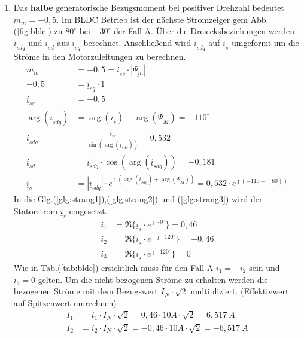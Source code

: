 \begin{solution}
\begin{enumerate}
\item Das \textbf{halbe} generatorische Bezugsmoment bei positiver Drehzahl bedeutet $m_m = -0,5$. Im BLDC Betrieb ist der nächste Stromzeiger gem Abb.(\ref{fig:bldc}) zu $80^\circ$ bei $-30^\circ$ der Fall A. Über die Dreiecksbeziehungen werden $\underline{i}_{sdq}$ und $\underline{i}_{sd}$ aus $\underline{i}_{sq}$ berechnet. Anschließend wird $\underline{i}_{sdq}$ auf $\underline{i}_{s}$ umgeformt um die Ströme in den Motorzuleitungen zu berechnen.
\begin{align}
m_m &= -0,5 = \underline{i}_{sq} \cdot |\underline{\Psi_m}|\\
-0,5 &= \underline{i}_{sq} \cdot 1\\
\underline{i}_{sq} &= -0,5\\
\arg(\underline{i}_{sdq}) &= \arg(\underline{i}_{s}) -\arg(\underline{\Psi}_{M})=-110^\circ\\
\underline{i}_{sdq} &= \frac{\underline{i}_{sq}}{\sin(\arg(\underline{i}_{sdq}))}= 0,532\\
\underline{i}_{sd} &= \underline{i}_{sdq} \cdot \cos(\arg(\underline{i}_{sdq})) = -0,181\\
\underline{i}_{s} &= |\underline{i}_{sdq}| \cdot e^{\jmath (\arg(\underline{i}_{sdq}) + \arg(\underline{\Psi}_{M}))}= 0,532 \cdot e^{\jmath ( -110 + (80))}
\end{align}
In die Glg.(\ref{glg:strang1}),(\ref{glg:strang2}) und (\ref{glg:strang3}) wird der Statorstrom $\underline{i}_s$ eingesetzt.
\begin{align}
i_1 & = \Re \{ \underline{i}_s \cdot e^{\jmath \cdot 0 ^\circ} \} = 0,46\\
i_2 & = \Re \{ \underline{i}_s \cdot e^{-\jmath \cdot 120 ^\circ} \} = -0,46 \\
i_3 & = \Re \{ \underline{i}_s \cdot e^{\jmath \cdot 120 ^\circ} \}=  0
\end{align}
Wie in Tab.(\ref{tab:bldc}) ersichtlich muss für den Fall A $i_1= -i_2$ sein und $i_3= 0$ gelten.
Um die nicht bezogenen Ströme zu erhalten werden die bezogenen Ströme mit dem Bezugswert $I_N \cdot \sqrt{2}$ multipliziert. (Effektivwert auf Spitzenwert umrechnen)
\begin{align}
I_1 & = i_1 \cdot I_N \cdot \sqrt{2} = 0,46\cdot 10 A \cdot \sqrt{2} =6,517~A \\
I_2 & = i_2 \cdot I_N \cdot \sqrt{2} = -0,46 \cdot 10 A \cdot \sqrt{2} =-6,517~A \\

\end{align}
\end{enumerate}
\end{solution}
